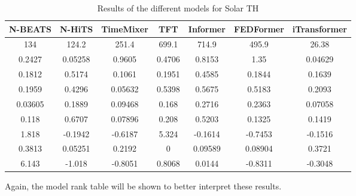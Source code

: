 \begin{table}[ht]
    \footnotesize
    \begin{flushright}
    \begin{tabular}[r]{|ccc|cccc}
        \toprule
        N-BEATS&N-HiTS&TimeMixer&TFT&Informer&FEDFormer&iTransformer  \\
        \midrule            
        134&124.2&251.4&699.1&714.9&495.9&26.38 \\
        0.2427&0.05258&0.9605&0.4706&0.8153&1.35&0.04629 \\
        0.1812&0.5174&0.1061&0.1951&0.4585&0.1844&0.1639 \\
        \midrule
        0.1959&0.4296&0.05632&0.5398&0.5675&0.5183&0.2093 \\
        0.03605&0.1889&0.09468&0.168&0.2716&0.2363&0.07058 \\
        0.118&0.6707&0.07896&0.208&0.5203&0.1325&0.1419 \\
        \midrule
        1.818&-0.1942&-0.6187&5.324&-0.1614&-0.7453&-0.1516 \\
        0.3813&0.05251&0.2192&0&0.09589&0.08904&0.3721 \\
        6.143&-1.018&-0.8051&0.8068&0.0144&-0.8311&-0.3048 \\
        \bottomrule
    \end{tabular}
    \end{flushright}
    \caption{Results of the different models for Solar TH\label{long}}
    \label{table:results-solar-th}
\end{table}
Again, the model rank table will be shown to better interpret these results.

